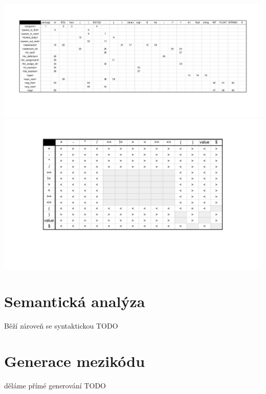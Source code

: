 \documentclass[a4paper, 11pt]{article}
\begin{document}
\includegraphics[width=\textwidth,height=\textheight,keepaspectratio]{LL_table.pdf}
\includegraphics[width=\textwidth,height=\textheight,keepaspectratio]{Precedence_table.pdf}

\newpage

\section{Semantická analýza}
Běží zároveň se syntaktickou TODO

\section{Generace mezikódu}
děláme přímé generování TODO
\end{document}
